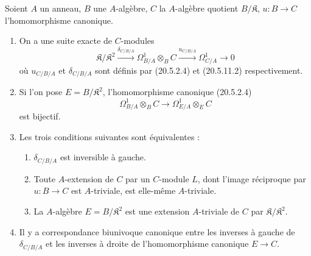 \begin{theorem}[20.5.12]
\label{0.20.5.12-fr}
Soient $A$ un anneau, $B$ une $A$-algèbre, $C$ la $A$-algèbre quotient
$B/\mathfrak{K}$, $u:B\to C$ l'homomorphisme canonique.
\begin{enumerate}
  \item[\rm(i)] On a une suite exacte de $C$-modules
\begin{equation}
\tag{20.5.12.1}
\label{0.20.5.12.1-fr}
  \mathfrak{K}/\mathfrak{K}^2
  \xrightarrow{\delta_{C/B/A}}\Omega^1_{B/A}\otimes_B C
  \xrightarrow{u_{C/B/A}}\Omega^1_{C/A}\longrightarrow 0
\end{equation}
où $u_{C/B/A}$ et $\delta_{C/B/A}$ sont définis par (20.5.2.4) et
(20.5.11.2) respectivement.
  \item[\rm(ii)] Si l'on pose $E=B/\mathfrak{K}^2$, l'homomorphisme
canonique (20.5.2.4)
\[
  \Omega^1_{B/A}\otimes_B C\longrightarrow
  \Omega^1_{E/A}\otimes_E C
\]
est bijectif.
  \item[\rm(iii)] Les trois conditions suivantes sont équivalentes :
  \begin{enumerate}
    \item[\rm a)] $\delta_{C/B/A}$ est inversible à gauche.
    \item[\rm b)] Toute $A$-extension de $C$ par un $C$-module $L$, dont
l'image réciproque par $u:B\to C$ est $A$-triviale, est elle-même
$A$-triviale.
    \item[\rm c)] La $A$-algèbre $E=B/\mathfrak{K}^2$ est une extension
$A$-triviale de $C$ par $\mathfrak{K}/\mathfrak{K}^2$.
  \end{enumerate}
  \item[\rm(iv)] Il y a correspondance biunivoque canonique entre les
inverses à gauche de $\delta_{C/B/A}$ et les inverses à droite de
l'homomorphisme canonique $E\to C$.
\end{enumerate}
\end{theorem}

